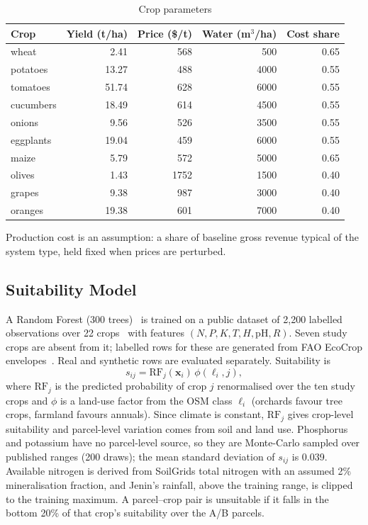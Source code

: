 \begin{table}[t]
\centering
\caption{Crop parameters}
\label{tab:crops}
\footnotesize
\begin{tabular}{lrrrr}
\toprule
Crop & Yield (t/ha) & Price (\$/t) & Water (m$^3$/ha) & Cost share \\
\midrule
wheat     &  2.41 &  568 &  500 & 0.65 \\
potatoes  & 13.27 &  488 & 4000 & 0.55 \\
tomatoes  & 51.74 &  628 & 6000 & 0.55 \\
cucumbers & 18.49 &  614 & 4500 & 0.55 \\
onions    &  9.56 &  526 & 3500 & 0.55 \\
eggplants & 19.04 &  459 & 6000 & 0.55 \\
maize     &  5.79 &  572 & 5000 & 0.65 \\
olives    &  1.43 & 1752 & 1500 & 0.40 \\
grapes    &  9.38 &  987 & 3000 & 0.40 \\
oranges   & 19.38 &  601 & 7000 & 0.40 \\
\bottomrule
\end{tabular}
\end{table}

Production cost is an assumption: a share of baseline gross revenue typical
of the system type, held fixed when prices are perturbed.

\subsection{Suitability Model}

A Random Forest (300 trees)~\cite{breiman2001} is trained on a public dataset
of 2{,}200 labelled observations over 22 crops~\cite{kagglecrop} with features
$(N,P,K,T,H,\mathrm{pH},R)$. Seven study crops are absent from it; labelled
rows for these are generated from FAO EcoCrop envelopes~\cite{ecocrop}. Real
and synthetic rows are evaluated separately. Suitability is
\begin{equation}
s_{ij}=\mathrm{RF}_j(\mathbf{x}_i)\,\phi(\ell_i,j),
\end{equation}
where $\mathrm{RF}_j$ is the predicted probability of crop $j$ renormalised
over the ten study crops and $\phi$ is a land-use factor from the OSM class
$\ell_i$ (orchards favour tree crops, farmland favours annuals). Since climate
is constant, $\mathrm{RF}_j$ gives crop-level suitability and parcel-level
variation comes from soil and land use. Phosphorus and potassium have no
parcel-level source, so they are Monte-Carlo sampled over published ranges
(200 draws); the mean standard deviation of $s_{ij}$ is 0.039. Available
nitrogen is derived from SoilGrids total nitrogen with an assumed 2\%
mineralisation fraction, and Jenin's rainfall, above the training range, is
clipped to the training maximum. A parcel--crop pair is unsuitable if it falls
in the bottom 20\% of that crop's suitability over the A/B parcels.

